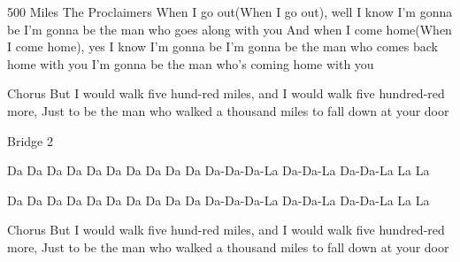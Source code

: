 \begin{song}{500 Miles The Proclaimers}{}{}{}{}{}
When I go out(When I go out), well I know I'm gonna be
I'm gonna be the man who goes along with you
And when I come home(When I come home), yes I know I'm gonna be
I'm gonna be the man who comes back home with you
I'm gonna be the man who's coming home with you


Chorus
But I would walk five hund-red miles, and
I would walk five hundred-red  more,
Just to be the man who walked a thousand  miles to
fall down at your door   

Bridge 2


Da Da Da Da          Da Da Da Da      Da Da Da-Da-Da-La Da-Da-La Da-Da-La La La

Da Da Da Da           Da Da Da Da      Da Da Da-Da-Da-La Da-Da-La Da-Da-La La La


Chorus
But I would walk five hund-red miles, and
I would walk five hundred-red  more,
Just to be the man who walked a thousand  miles to
fall down  at  your  door   

\end{song}

